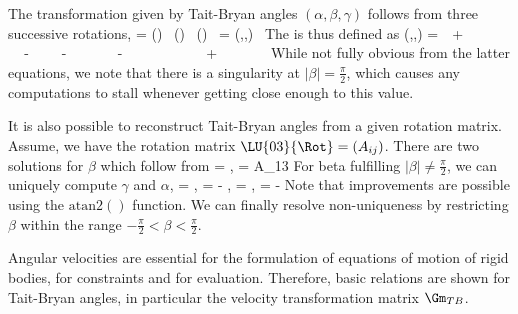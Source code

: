 %
%

\noindent The transformation given by Tait-Bryan angles $(\alpha,\beta,\gamma)$ follows from three successive rotations,
\be
   = (\alpha) \, (\beta) \, (\gamma) \,  \quad
   \quad {} = (\alpha,\beta,\gamma) \, 
\ee
The  is thus defined as
\be
  (\alpha,\beta,\gamma) = \mr{\co\beta \,\co\gamma}{-\co\beta\,\si\gamma}{\si\beta} {\co \alpha \,\si \gamma + \si \alpha \,\si \beta \,\co \gamma}{\co \alpha \,\co\gamma-\si\alpha\,\si\beta\,\si\gamma}{-\si\alpha\,\co\beta} {\si\alpha\,\si\gamma-\co\alpha\,\si\beta\,\co\gamma}{\si\alpha\,\co\gamma+\co\alpha\,\si\beta\,\si\gamma}{\co\alpha\,\co\beta}
\ee
While not fully obvious from the latter equations, we note that there is a singularity at $|\beta| = \frac{\pi}{2}$, which causes any computations to stall whenever getting close enough to this value.

\noindent It is also possible to reconstruct Tait-Bryan angles from a given rotation matrix.
Assume, we have the rotation matrix $\LU{03}{\Rot}=(A_{ij})$.
There are two solutions for $\beta$ which follow from
\be
  \cos \beta = \pm {}, \quad {} \quad \sin \beta = A_{13}
\ee
For beta fulfilling $|\beta| \ne \frac{\pi}{2}$, we can uniquely compute $\gamma$ and $\alpha$,
\be
  \cos \gamma = , \quad \sin \gamma = - , \quad
  \cos \alpha = , \quad {} \quad \sin \alpha = -  \eqDot
\ee
Note that improvements are possible using the $\mathrm{atan2}()$ function.
We can finally resolve non-uniqueness by restricting $\beta$ within the range $-\frac{\pi}{2} < \beta < \frac{\pi}{2}$.

%
Angular velocities are essential for the formulation of equations of motion of rigid bodies, for constraints and for evaluation.
Therefore, basic relations are shown for Tait-Bryan angles, in particular the velocity transformation matrix $\Gm_{TB}$.

